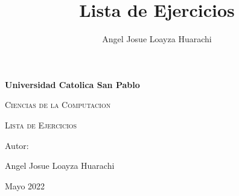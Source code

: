 \documentclass[10pt,a4paper]{article}
\author{Angel Josue Loayza Huarachi}
\title{Lista de Ejercicios}
\begin{document}
\begin{titlepage}
	\centering
	{\bfseries\LARGE Universidad Catolica San Pablo \par}
	\vspace{1cm}
	{\scshape\Large Ciencias de la Computacion \par}
	\vspace{3cm}
	{\scshape\Huge Lista de Ejercicios \par}
	\vspace{3cm}
	{\Large Autor: \par}
	{\Large Angel Josue Loayza Huarachi \par}
	\vfill
	{\Large Mayo 2022 \par}
\end{titlepage}

\tableofcontents
\newpage
\end{document}
